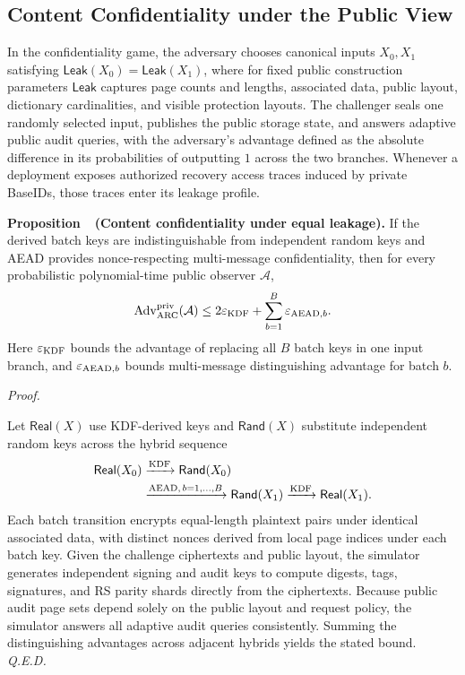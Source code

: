\documentclass[10pt,journal]{IEEEtran}
\newcounter{proposition}
\newenvironment{proposition}[1]{%
  \refstepcounter{proposition}\par\smallskip\noindent
  \textbf{Proposition~\theproposition\ (#1). }\ignorespaces
}{\par\smallskip}
\newenvironment{claimproof}{\par\noindent\emph{Proof. }\ignorespaces
}{\hfill\textit{Q.E.D.}\par\smallskip}
\begin{document}
\subsection{Content Confidentiality under the Public View}\label{sec:confidentiality}
In the confidentiality game, the adversary chooses canonical inputs $X_0,X_1$ satisfying $\mathsf{Leak}(X_0)=\mathsf{Leak}(X_1)$, where for fixed public construction parameters $\mathsf{Leak}$ captures page counts and lengths, associated data, public layout, dictionary cardinalities, and visible protection layouts. The challenger seals one randomly selected input, publishes the public storage state, and answers adaptive public audit queries, with the adversary's advantage defined as the absolute difference in its probabilities of outputting $1$ across the two branches. Whenever a deployment exposes authorized recovery access traces induced by private BaseIDs, those traces enter its leakage profile.

\begin{proposition}{Content confidentiality under equal leakage}\label{prop:confidentiality}
If the derived batch keys are indistinguishable from independent random keys and AEAD provides nonce-respecting multi-message confidentiality, then for every probabilistic polynomial-time public observer $\mathcal A$,
\begin{equation}
\operatorname{Adv}^{\rm priv}_{\rm ARC}(\mathcal A)
\leq 2\varepsilon_{\rm KDF}+\sum_{b=1}^{B}\varepsilon_{{\rm AEAD},b}.
\end{equation}
Here $\varepsilon_{\rm KDF}$ bounds the advantage of replacing all $B$ batch keys in one input branch, and $\varepsilon_{{\rm AEAD},b}$ bounds multi-message distinguishing advantage for batch $b$.
\end{proposition}
\begin{claimproof}
Let $\mathsf{Real}(X)$ use KDF-derived keys and $\mathsf{Rand}(X)$ substitute independent random keys across the hybrid sequence
\begin{equation}
\begin{aligned}
\mathsf{Real}(X_0)
&\xrightarrow{\rm KDF}\mathsf{Rand}(X_0)\\
&\xrightarrow{{\rm AEAD},\,b=1,\ldots,B}\mathsf{Rand}(X_1)
\xrightarrow{\rm KDF}\mathsf{Real}(X_1).
\end{aligned}
\end{equation}
Each batch transition encrypts equal-length plaintext pairs under identical associated data, with distinct nonces derived from local page indices under each batch key. Given the challenge ciphertexts and public layout, the simulator generates independent signing and audit keys to compute digests, tags, signatures, and RS parity shards directly from the ciphertexts. Because public audit page sets depend solely on the public layout and request policy, the simulator answers all adaptive audit queries consistently. Summing the distinguishing advantages across adjacent hybrids yields the stated bound.
\end{claimproof}
\end{document}
